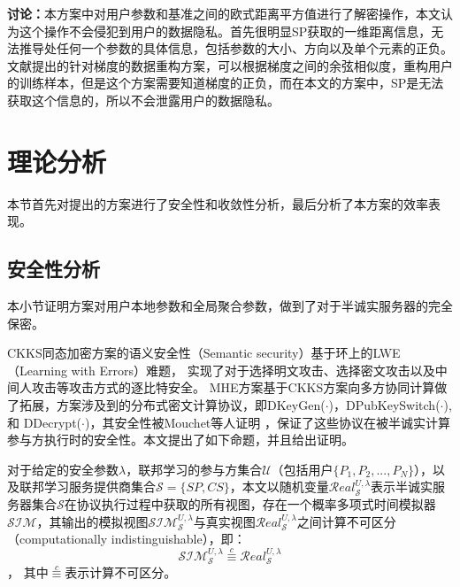 \textbf{讨论：}本方案中对用户参数和基准之间的欧式距离平方值进行了解密操作，本文认为这个操作不会侵犯到用户的数据隐私。首先很明显SP获取的一维距离信息，无法推导处任何一个参数的具体信息，包括参数的大小、方向以及单个元素的正负。文献\cite{geiping2020inverting}提出的针对梯度的数据重构方案，可以根据梯度之间的余弦相似度，重构用户的训练样本，但是这个方案需要知道梯度的正负，而在本文的方案中，SP是无法获取这个信息的，所以不会泄露用户的数据隐私。

\section{理论分析}\label{ana}
本节首先对提出的方案进行了安全性和收敛性分析，最后分析了本方案的效率表现。
\subsection{安全性分析}
本小节证明方案对用户本地参数和全局聚合参数，做到了对于半诚实服务器的完全保密。

CKKS同态加密方案的语义安全性（Semantic security）基于环上的LWE（Learning with Errors）难题，
实现了对于选择明文攻击、选择密文攻击以及中间人攻击等攻击方式的逐比特安全\cite{cheon2017homomorphic, lindner2011better, lyubashevsky2010ideal}。
MHE方案基于CKKS方案向多方协同计算做了拓展，方案涉及到的分布式密文计算协议，即DKeyGen($\cdot$)，DPubKeySwitch($\cdot$), 和 DDecrypt($\cdot$)，其安全性被Mouchet等人证明 \cite{mouchet2020multiparty}，保证了这些协议在被半诚实计算参与方执行时的安全性。本文提出了如下命题，并且给出证明。
\begin{proposition}[对半诚实服务器的安全性]\label{pro1}
	对于给定的安全参数$ \lambda $，联邦学习的参与方集合$\mathcal{U}$（包括用户$\{P_1, P_2,...,P_N\}$），以及联邦学习服务提供商集合$\mathcal{S} = \{SP, CS\}$，本文以随机变量$\mathcal{R} e a l_{\mathcal{S}}^{U, \lambda}$表示半诚实服务器集合$\mathcal{S}$在协议执行过程中获取的所有视图，存在一个概率多项式时间模拟器$\mathcal{SIM}$，其输出的模拟视图$ \mathcal{S I} \mathcal{M}_{\mathcal{S}}^{U, \lambda} $与真实视图$\mathcal{R} e a l_{\mathcal{S}}^{U, \lambda}$之间计算不可区分（computationally indistinguishable），即：
	$$
		\mathcal{S I} \mathcal{M}_{\mathcal{S}}^{U, \lambda} \stackrel{c}{\equiv} \mathcal{R} e a l_{\mathcal{S}}^{U, \lambda}
	$$，
	其中$\mathop{\equiv}\limits^{c}$表示计算不可区分。
\end{proposition}

